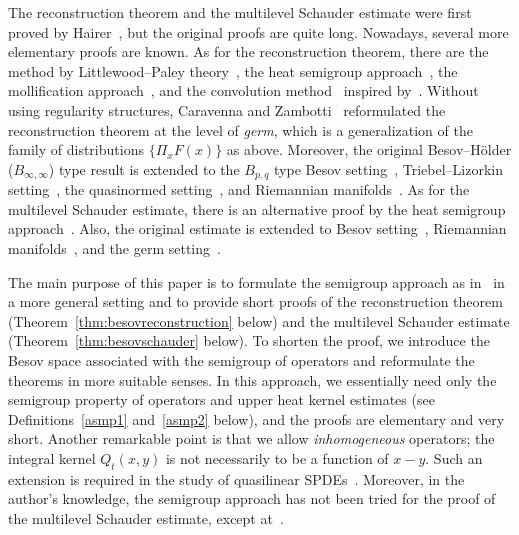 \documentclass[AHL,Unicode,longabstracts,published]{cedram}
\begin{document}
The reconstruction theorem and the multilevel Schauder estimate were first proved by Hairer~\cite{Hai14}, but the original proofs are quite long. Nowadays, several more elementary proofs are known. As for the reconstruction theorem, there are the method by Littlewood--Paley theory~\cite{GIP15}, the heat semigroup approach~\cite{BH20,OW19}, the mollification approach~\cite{ST18}, and the convolution method~\cite{FH20} inspired by~\cite{OW19}. Without using regularity structures, Caravenna and Zambotti~\cite{CZ20} reformulated the reconstruction theorem at the level of \emph{germ}, which is a generalization of the family of distributions $\{\Pi_xF(x)\}$ as above. Moreover, the original Besov--H\"older ($B_{\infty,\infty}$) type result is extended to the $B_{p,q}$ type Besov setting~\cite{BL22,HL17, LPT21, ST18}, Triebel--Lizorkin setting~\cite{HR20}, the quasinormed setting~\cite{ZK23}, and Riemannian manifolds~\cite{DDD19, HS23+,RS21}. As for the multilevel Schauder estimate, there is an alternative proof by the heat semigroup approach~\cite{BH20}. Also, the original estimate is extended to Besov setting~\cite{HL17}, Riemannian manifolds~\cite{DDD19, HS23+}, and the germ setting~\cite{BCZ23}.

The main purpose of this paper is to formulate the semigroup approach as in~\cite{BH20,OW19} in a more general setting and to provide short proofs of the reconstruction theorem (Theorem~\ref{thm:besovreconstruction} below) and the multilevel Schauder estimate (Theorem~\ref{thm:besovschauder} below). To shorten the proof, we introduce the Besov space associated with the semigroup of operators and reformulate the theorems in more suitable senses. In this approach, we essentially need only the semigroup property of operators and upper heat kernel estimates (see Definitions~\ref{asmp1} and~\ref{asmp2} below), and the proofs are elementary and very short. Another remarkable point is that we allow \emph{inhomogeneous} operators; the integral kernel $Q_t(x,y)$ is not necessarily to be a function of $x-y$. Such an extension is required in the study of quasilinear SPDEs~\cite{BHK22}. Moreover, in the author's knowledge, the semigroup approach has not been tried for the proof of the multilevel Schauder estimate, except at~\cite{BH20}.
\end{document}
